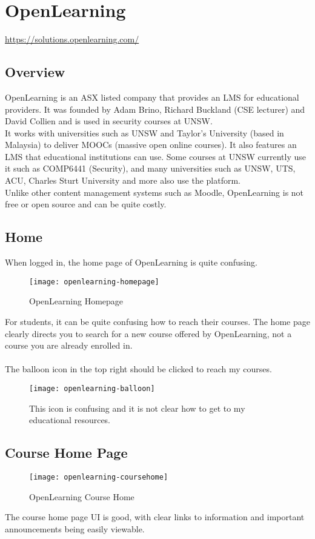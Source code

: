 
\section{OpenLearning}
\url{https://solutions.openlearning.com/}
\subsection{Overview}
OpenLearning is an ASX listed company that provides an LMS for educational providers. It was founded by Adam Brino, Richard Buckland (CSE lecturer) and David Collien and is used in security courses at UNSW\cite{openlearning}.\\
It works with universities such as UNSW and Taylor's University (based in Malaysia) to deliver MOOCs (massive open online courses). It also features an LMS that educational institutions can use. Some courses at UNSW currently use it such as COMP6441 (Security), and many universities such as UNSW, UTS, ACU, Charles Sturt University and more also use the platform.\\
Unlike other content management systems such as Moodle, OpenLearning is not free or open source and can be quite costly\cite{openlearningPricing}.\\

\subsection{Home}
When logged in, the home page of OpenLearning is quite confusing.\\
\begin{figure}[h!]
    \centering
    \texttt{[image: openlearning-homepage]}
    \caption{OpenLearning Homepage}
\end{figure}

For students, it can be quite confusing how to reach their courses. The home page clearly directs you to search for a new course offered by OpenLearning, not a course you are already enrolled in. \\
\\
The balloon icon in the top right should be clicked to reach my courses. \\
\begin{figure}[h!]
    \centering
    \texttt{[image: openlearning-balloon]}
    \caption{This icon is confusing and it is not clear how to get to my educational resources.}
\end{figure}
\newpage    
\subsection{Course Home Page}
\begin{figure}[h!]
    \centering
    \texttt{[image: openlearning-coursehome]}
    \caption{OpenLearning Course Home}
\end{figure}
The course home page UI is good, with clear links to information and important announcements being easily viewable.\\

